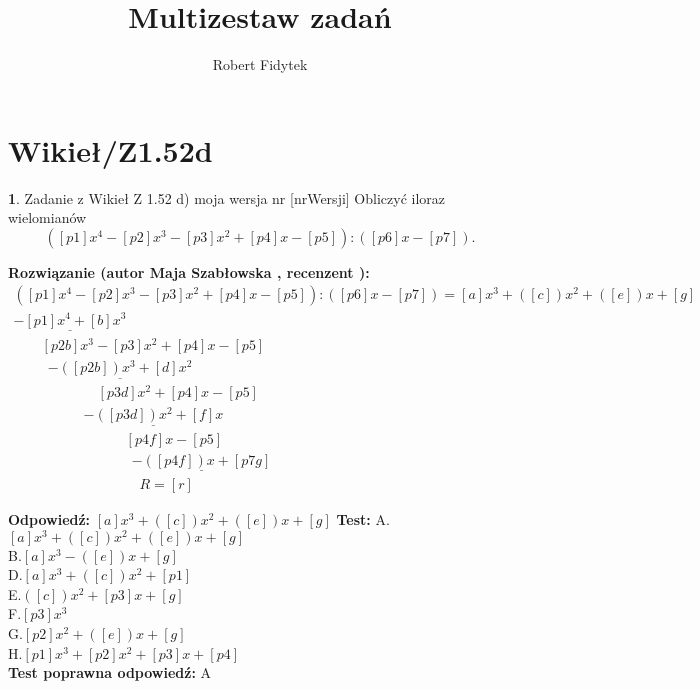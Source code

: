 \documentclass[12pt, a4paper]{article}
\title{Multizestaw zadań}
\author{Robert Fidytek}
\date{}
\theoremstyle{definition} %
\newtheorem{zad}{}
\newcommand{\kategoria}[1]{\section{#1}} %
\newcommand{\zadStart}[1]{\begin{zad}#1\newline} %
\newcommand{\zadStop}{\end{zad}}   %
\newcommand{\rozwStart}[2]{\noindent \textbf{Rozwiązanie (autor #1 , recenzent #2): }\newline} %
\newcommand{\rozwStop}{\newline}                                            %
\newcommand{\odpStart}{\noindent \textbf{Odpowiedź:}\newline}    %
\newcommand{\odpStop}{\newline}                                             %
\newcommand{\testStart}{\noindent \textbf{Test:}\newline} %
\newcommand{\testStop}{\newline} %
\newcommand{\kluczStart}{\noindent \textbf{Test poprawna odpowiedź:}\newline} %
\newcommand{\kluczStop}{\newline} %
\begin{document}
\maketitle


\kategoria{Wikieł/Z1.52d}
\zadStart{Zadanie z Wikieł Z 1.52 d)  moja wersja nr [nrWersji]}
Obliczyć iloraz wielomianów $$([p1]x^{4}-[p2]x^{3}-[p3]x^{2}+[p4]x-[p5]):([p6]x-[p7]).$$

\zadStop

\rozwStart{Maja Szabłowska}{}
$$\begin{array}{lll}
([p1]x^{4}-[p2]x^{3}-[p3]x^{2}+[p4]x-[p5]):([p6]x-[p7])  =  [a]x^3 +([c])x^2 + ([e])x +[g] \\
\underline{-[p1]x^4 + [b]x^3} & &  \\
\qquad [p2b]x^3  -[p3]x^2 +[p4]x -[p5] & & \\
\qquad \ \ \underline{-([p2b])x^3 +[d]x^2} & &\\
\qquad \qquad \qquad [p3d]x^2 + [p4]x - [p5] & & \\
\qquad \qquad \quad \underline{-([p3d])x^2 + [f]x}  & & \\
\qquad \qquad \qquad \qquad [p4f]x - [p5] & & \\
\qquad \qquad \qquad \qquad \ \ \underline{-([p4f])x + [p7g]} & & \\
\qquad \qquad \qquad \qquad \quad R = [r] & &
\end{array}$$
\rozwStop


\odpStart
$[a]x^3 +([c])x^2 + ([e])x +[g]$
\odpStop
\testStart
A.$[a]x^3 +([c])x^2 + ([e])x +[g]$\\
B.$[a]x^3 - ([e])x +[g]$\\
D.$[a]x^3 +([c])x^2 +[p1]$\\
E.$([c])x^2 + [p3]x +[g]$\\
F.$[p3]x^3 $\\
G.$[p2]x^2 + ([e])x +[g]$\\
H.$[p1]x^3 +[p2]x^2 + [p3]x +[p4]$\\
\testStop
\kluczStart
A
\kluczStop
\end{document}
